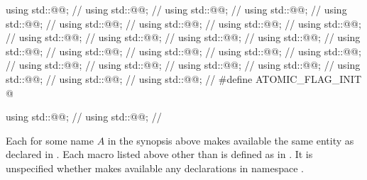 \begin{codeblock}
using std::@@;                          // \seebelow
using std::@@;                                  // \seebelow
using std::@@;                         // \seebelow
using std::@@;                                 // \seebelow
using std::@@;                        // \seebelow
using std::@@;                              // \seebelow
using std::@@;                     // \seebelow
using std::@@;               // \seebelow
using std::@@;      // \seebelow
using std::@@;                 // \seebelow
using std::@@;        // \seebelow
using std::@@;                             // \seebelow
using std::@@;                    // \seebelow
using std::@@;                             // \seebelow
using std::@@;                    // \seebelow
using std::@@;                             // \seebelow
using std::@@;                    // \seebelow
using std::@@;                              // \seebelow
using std::@@;                     // \seebelow
using std::@@;                             // \seebelow
using std::@@;                    // \seebelow
using std::@@;                     // \seebelow
using std::@@;            // \seebelow
using std::@@;                            // \seebelow
using std::@@;                   // \seebelow
#define ATOMIC_FLAG_INIT @\seebelow@

using std::@@;                          // \seebelow
using std::@@;                          // \seebelow
\end{codeblock}

\pnum
Each  for some name $A$ in the synopsis above
makes available the same entity as 
declared in .
Each macro listed above other than 
is defined as in .
It is unspecified whether  makes available
any declarations in namespace .


